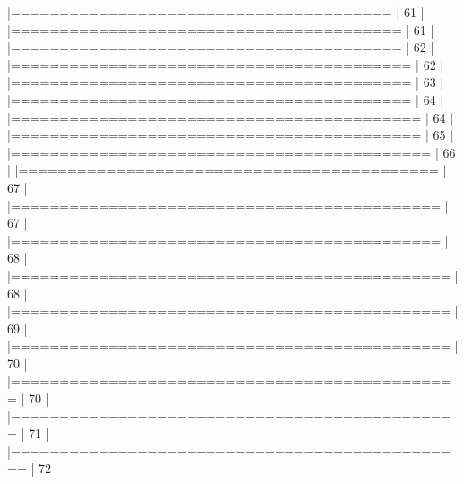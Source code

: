 \documentclass[10pt]{article}
\newenvironment{CodeChunk}{}{}
\begin{document}
\begin{CodeChunk}
\begin{CodeChunk}
\begin{CodeOutput}
  |=======================================                          |  61%
  |                                                                       
  |========================================                         |  61%
  |                                                                       
  |========================================                         |  62%
  |                                                                       
  |=========================================                        |  62%
  |                                                                       
  |=========================================                        |  63%
  |                                                                       
  |=========================================                        |  64%
  |                                                                       
  |==========================================                       |  64%
  |                                                                       
  |==========================================                       |  65%
  |                                                                       
  |===========================================                      |  66%
  |                                                                       
  |===========================================                      |  67%
  |                                                                       
  |============================================                     |  67%
  |                                                                       
  |============================================                     |  68%
  |                                                                       
  |=============================================                    |  68%
  |                                                                       
  |=============================================                    |  69%
  |                                                                       
  |=============================================                    |  70%
  |                                                                       
  |==============================================                   |  70%
  |                                                                       
  |==============================================                   |  71%
  |                                                                       
  |===============================================                  |  72%

\end{CodeOutput}
\end{CodeChunk}
\end{CodeChunk}
\end{document}
